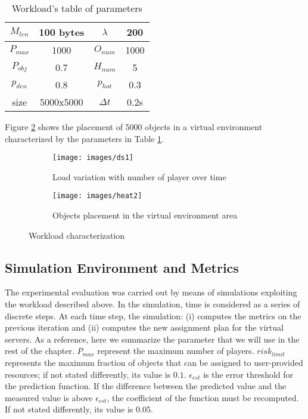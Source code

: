\documentclass[final,10pt,a5paper]{phdimt}
\theoremstyle{definition}
\begin{document}
\begin{table}
\centering
\begin{tabular}{|c|c||c|c|}
\hline
$M_{len}$ & 100 bytes & $\lambda$ & 200 \\
\hline
$P_{max}$ & 1000 & $O_{num}$ & 1000 \\
\hline
$P_{obj}$ & 0.7 & $H_{num}$ & 5 \\
\hline
$p_{den}$ & 0.8 & $p_{hot}$ & 0.3 \\
\hline
size & 5000x5000 & $\Delta t$ & 0.2s \\
\hline
\end{tabular}
\caption{Workload's table of parameters}\label{tab:par-work}
\end{table}

Figure \ref{fig:obj-place} shows the placement of 5000 objects in a virtual environment characterized by the parameters in Table \ref{tab:par-work}.






\begin{figure}
\centering
        \begin{subfigure}[b]{0.45\textwidth}
                \centering
                \texttt{[image: images/ds1]}
                \caption{Load variation with number of player over time}
                \label{fig:dataset}
        \end{subfigure}\quad      
        \begin{subfigure}[b]{0.45\textwidth}
                \centering
                \texttt{[image: images/heat2]}
                \caption{Objects placement in the virtual environment area}
                \label{fig:obj-place}
        \end{subfigure}\caption{Workload characterization}\label{fig:dset-char}
\end{figure}




\subsection{Simulation Environment and Metrics}

The experimental evaluation was carried out by means of simulations exploiting the workload described above.
In the simulation, time is considered as a series of discrete steps.
At each time step, the simulation: 
(i) computes the metrics on the previous iteration and 
(ii) computes the new assignment plan for the virtual servers.
As a reference, here we summarize the parameter that we will use in the rest of the chapter. $P_{max}$ represent the maximum number of players. $risk_{limit}$ represents the maximum fraction of objects that can be assigned to user-provided resources; if not stated differently, its value is $0.1$. 
$\epsilon_{est}$ is the error threshold for the prediction function. If the difference between the predicted value and the measured value is above $\epsilon_{est}$, the coefficient of the function must be recomputed. If not stated differently, its value is $0.05$.
\end{document}
